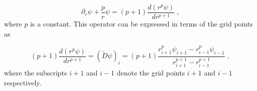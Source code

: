 \begin{equation}
    \partial_r \psi + \frac{p}{r}\psi = (p+1) \frac{d(r^p \psi)}{dr^{p+1}}\;,
\end{equation}
%
where $p$ is a constant. This operator can be expressed in terms of the grid points as 

\begin{equation}
    (p+1) \frac{d(r^p \psi)}{dr^{p+1}}=(\tilde{D}\psi)_i = (p+1)\frac{r^p_{i+1}\psi_{i+1}-r^p_{i-1}\psi_{i-1}}{r^{p+1}_{i+1}-r^{p+1}_{i-1}}\;,
\end{equation}
%
where the subscripts $i+1$ and $i-1$ denote the grid points $i+1$ and $i-1$ respectively.